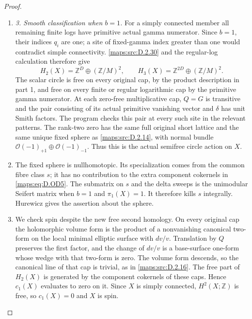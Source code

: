 \begin{proof}
\begin{enumerate}[label=\arabic*.,leftmargin=*]
\item \emph{3. Smooth classification when $b=1$.}
For a simply connected member all remaining finite logs have
primitive actual gamma numerator. Since $b=1$, their indices
$q_i$ are one; a site of fixed-gamma index greater than one
would contradict simple connectivity. \ref{maps:src:D.2.30} and the
regular-log calculation therefore give
\[
 H_2(X)=\mathbb Z^D\oplus(\mathbb Z/M)^2,
 \qquad H_3(X)=\mathbb Z^{2D}\oplus(\mathbb Z/M)^2.
\]
The scalar circle is free on every original cap, by the
product description in part 1, and free on every finite
or regular logarithmic cap by the primitive gamma numerator.
At each zero-free multiplicative cap, $Q=G$ is transitive
and the pair consisting of its actual primitive vanishing
vector and $\delta$ has unit Smith factors. The program
checks this pair at every such site in the relevant patterns.
The rank-two zero has the same full original short lattice
and the same unique fixed sphere as \ref{maps:src:D.2.14}, with normal
bundle $\mathcal O(-1)_{+1}\oplus\mathcal O(-1)_{-1}$.
Thus this is the actual semifree circle action on $X$.

\item The fixed sphere is nullhomotopic. Its specialization comes
from the common fibre class $s$; it has no contribution to
the extra component cokernels in \eqref{maps:eq:D.OD5}. The submatrix on
$s$ and the delta sweeps is the unimodular Seifert matrix
when $b=1$ and $\pi_1(X)=1$. It therefore kills $s$
integrally. Hurewicz gives the assertion about the sphere.

\item We check spin despite the new free second homology. On every
original cap the holomorphic volume form is the product of
a nonvanishing canonical two-form on the local minimal
elliptic surface with $dv/v$. Translation by $Q$ preserves
the first factor, and the change of $dv/v$ is a base-surface
one-form whose wedge with that two-form is zero. The volume
form descends, so the canonical line of that cap is trivial,
as in \ref{maps:src:D.2.16}. The free part of $H_2(X)$ is generated by the
component cokernels of these caps. Hence $c_1(X)$ evaluates
to zero on it. Since $X$ is simply connected,
$H^2(X;\mathbb Z)$ is free, so $c_1(X)=0$ and $X$ is spin.


\end{enumerate}
\end{proof}
